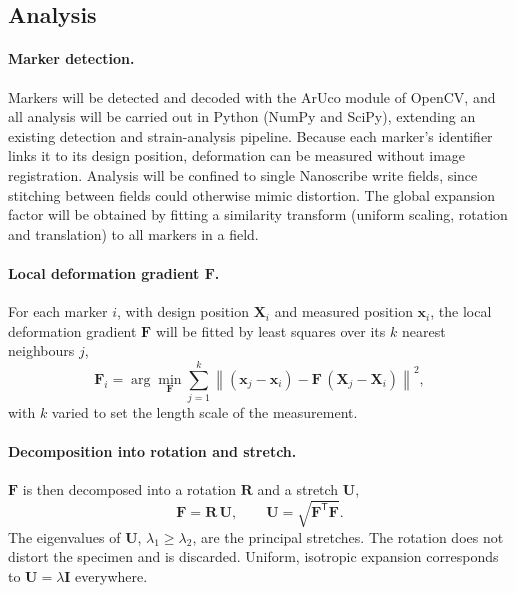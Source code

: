 \documentclass[%
 reprint,
 11pt,
 amsmath,amssymb,
 aps,
]{revtex4-2}
\begin{document}
\subsection{Analysis}

\paragraph{Marker detection.}
Markers will be detected and decoded with the ArUco module of OpenCV,\cite{aruco,opencv}
and all analysis will be carried out in Python (NumPy and SciPy\cite{numpy,scipy}),
extending an existing detection and strain-analysis pipeline. Because each marker's
identifier links it to its design position, deformation can be measured without image
registration. Analysis will be confined to single Nanoscribe write fields, since
stitching between fields could otherwise mimic distortion. The global expansion factor
will be obtained by fitting a similarity transform (uniform scaling, rotation and
translation) to all markers in a field.

\paragraph{Local deformation gradient $\mathbf{F}$.}
For each marker $i$, with design position $\mathbf{X}_i$ and measured position
$\mathbf{x}_i$, the local deformation gradient $\mathbf{F}$ will be fitted by least
squares over its $k$ nearest neighbours $j$,\cite{falk,gullett}
\begin{equation}
  \mathbf{F}_i = \arg\min_{\mathbf{F}} \sum_{j=1}^{k}
  \left\| (\mathbf{x}_j - \mathbf{x}_i) - \mathbf{F}\,(\mathbf{X}_j - \mathbf{X}_i) \right\|^2 ,
  \label{eq:F}
\end{equation}
with $k$ varied to set the length scale of the measurement.

\paragraph{Decomposition into rotation and stretch.}
$\mathbf{F}$ is then decomposed into a rotation $\mathbf{R}$ and a stretch
$\mathbf{U}$,\cite{hoger1984}
\begin{equation}
  \mathbf{F} = \mathbf{R}\,\mathbf{U}, \qquad
  \mathbf{U} = \sqrt{\mathbf{F}^{\mathsf{T}}\mathbf{F}} .
  \label{eq:polar}
\end{equation}
The eigenvalues of $\mathbf{U}$, $\lambda_1 \ge \lambda_2$, are the principal stretches. The rotation
does not distort the specimen and is discarded. Uniform, isotropic expansion
corresponds to $\mathbf{U} = \lambda\mathbf{I}$ everywhere.
\end{document}
